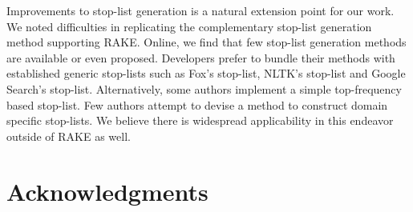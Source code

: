 \documentclass[11pt,a4paper]{article}
\begin{document}
Improvements to stop-list generation is a natural extension point for our work. We noted difficulties in replicating the complementary stop-list generation method supporting RAKE. Online, we find that few stop-list generation methods are available or even proposed. Developers prefer to bundle their methods with established generic stop-lists such as Fox's stop-list, NLTK's stop-list and Google Search's stop-list. Alternatively, some authors implement a simple top-frequency based stop-list. Few authors attempt to devise a method to construct domain specific stop-lists. We believe there is widespread applicability in this endeavor outside of RAKE as well.


\newpage
\section{Acknowledgments}
\end{document}
